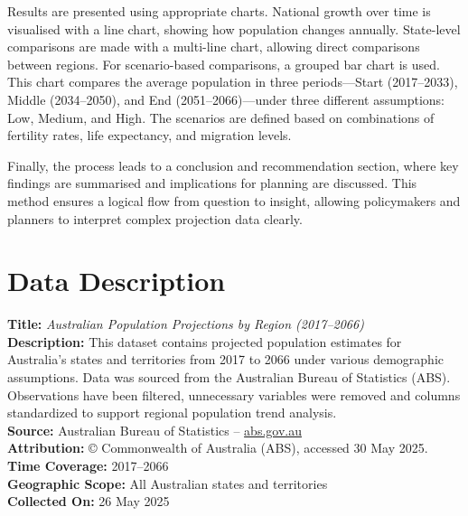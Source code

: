 \documentclass[
  11pt,
]{article}
\begin{document}
Results are presented using appropriate charts. National growth over
time is visualised with a line chart, showing how population changes
annually. State-level comparisons are made with a multi-line chart,
allowing direct comparisons between regions. For scenario-based
comparisons, a grouped bar chart is used. This chart compares the
average population in three periods---Start (2017--2033), Middle
(2034--2050), and End (2051--2066)---under three different assumptions:
Low, Medium, and High. The scenarios are defined based on combinations
of fertility rates, life expectancy, and migration levels.

Finally, the process leads to a conclusion and recommendation section,
where key findings are summarised and implications for planning are
discussed. This method ensures a logical flow from question to insight,
allowing policymakers and planners to interpret complex projection data
clearly.

\section{Data Description}\label{data-description}

\begin{tcolorbox}[enhanced jigsaw, rightrule=.15mm, colframe=quarto-callout-note-color-frame, opacitybacktitle=0.6, leftrule=.75mm, title=\textcolor{quarto-callout-note-color}{\faInfo}\hspace{0.5em}{Meta Data}, opacityback=0, toprule=.15mm, toptitle=1mm, breakable, colbacktitle=quarto-callout-note-color!10!white, bottomrule=.15mm, left=2mm, arc=.35mm, colback=white, coltitle=black, bottomtitle=1mm, titlerule=0mm]

\textbf{Title:} \emph{Australian Population Projections by Region
(2017--2066)}\\
\textbf{Description:} This dataset contains projected population
estimates for Australia's states and territories from 2017 to 2066 under
various demographic assumptions. Data was sourced from the Australian
Bureau of Statistics (ABS). Observations have been filtered, unnecessary
variables were removed and columns standardized to support regional
population trend analysis.\\
\textbf{Source:} Australian Bureau of Statistics --
\href{https://www.abs.gov.au}{abs.gov.au}\\
\textbf{Attribution:} © Commonwealth of Australia (ABS), accessed 30 May
2025.\\
\textbf{Time Coverage:} 2017--2066\\
\textbf{Geographic Scope:} All Australian states and territories\\
\textbf{Collected On:} 26 May 2025

\end{tcolorbox}
\end{document}
